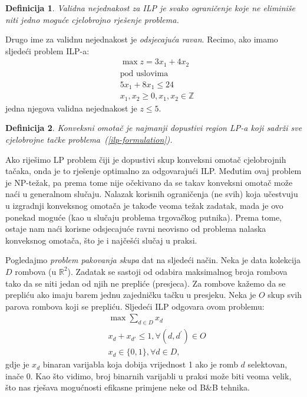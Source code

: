 \documentclass[a4paper, utf8, 11pt, colorlinks]{book}
\newtheorem{definition}{Definicija}
\begin{document}
 \begin{definition}{Validna nejednakost} za ILP je svako ograničenje koje ne eliminiše niti   jedno moguće cjelobrojno rješenje problema.
 \end{definition}
 Drugo ime za {validnu nejednakost} je \emph{odsjecajuća ravan}.
Recimo, ako imamo sljedeći problem ILP-a:
\begin{align*}
    &\max z = 3x_1 + 4 x_2 \\
    &\mbox{pod uslovima } \\
    &5x_1 + 8x_1 \leq 24 \\
    & x_1, x_2 \geq 0, x_1,x_2\in \mathbb{Z}
\end{align*}
jedna njegova validna nejednakost je $z \leq 5$. 

\begin{definition}
      Konveksni omotač je najmanji dopustivi region LP-a koji sadrži sve cjelobrojne tačke problema~(\ref{ilp-formulation}).
\end{definition}
Ako riješimo LP problem čiji je dopustivi skup konveksni omotač cjelobrojnih tačaka, onda je to rješenje optimalno za odgovarajući ILP. Međutim ovaj problem je  NP-težak, pa prema tome nije očekivano da se takav konveksni omotač može naći u generalnom slučaju. Nalazak korisnih ograničenja (ne svih) koja učestvuju u izgradnji konveksnog omotača je takođe veoma težak zadatak, mada je ovo ponekad moguće (kao u slučaju problema trgovačkog putnika). Prema tome, ostaje nam naći korisne odsjecajuće ravni neovisno od problema nalaska konveksnog omotača, što je i najčešći slučaj u praksi. 

Pogledajmo   \emph{problem pakovanja skupa} dat na sljedeći način. Neka je data kolekcija $D$ rombova (u $\mathbb{R}^2$). 
Zadatak se sastoji od odabira maksimalnog broja rombova tako da se niti jedan od njih ne prepliće (presjeca).  Za rombove kažemo da se prepliću ako imaju barem jednu zajedničku tačku u presjeku. 
Neka je $O$ skup svih parova rombova koji se prepliću. Sljedeći ILP odgovara ovom problemu:
\begin{align*}
    &\max \sum_{d\in D}x_d\\
    & x_d + x_{d'} \leq 1, \forall (d, d^{'}) \in O \\
    & x_d \in \{0,1\}, \forall d \in D,
\end{align*}
gdje je $x_d$ binaran varijabla koja dobija vrijednost 1 ako je romb $d$ selektovan, inače 0. 
Kao što vidimo, broj binarnih varijabli u praksi može biti veoma velik, što nas rješava mogućnosti efikasne primjene neke od B\&B tehnika.
\end{document}
